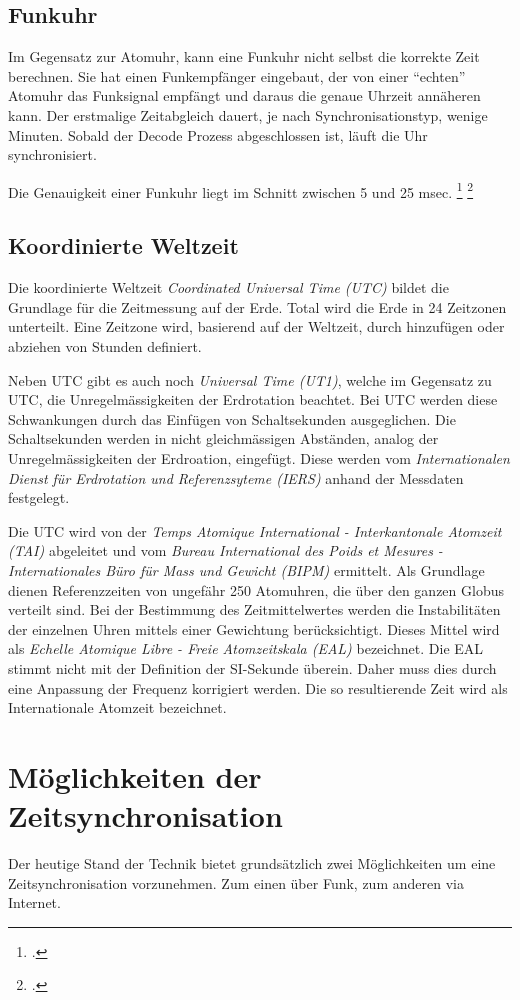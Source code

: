 \subsection{Funkuhr}
Im Gegensatz zur Atomuhr, kann eine Funkuhr nicht selbst die korrekte Zeit berechnen. Sie hat einen Funkempfänger eingebaut, der von einer "`echten"' Atomuhr das Funksignal empfängt und daraus die genaue Uhrzeit annäheren kann. Der erstmalige Zeitabgleich dauert, je nach Synchronisationstyp, wenige Minuten. Sobald der Decode Prozess abgeschlossen ist, läuft die Uhr synchronisiert.

Die Genauigkeit einer Funkuhr liegt im Schnitt zwischen 5 und 25 msec. \footcite{wikiFunkuhr} \footcite{heretFunkuhr}

\subsection{Koordinierte Weltzeit}
Die koordinierte Weltzeit \textit{Coordinated Universal Time (UTC)} bildet die Grundlage für die Zeitmessung auf der Erde. Total wird die Erde in 24 Zeitzonen unterteilt. Eine Zeitzone wird, basierend auf der Weltzeit, durch hinzufügen oder abziehen von Stunden definiert.

Neben UTC gibt es auch noch \textit{Universal Time (UT1)}, welche im Gegensatz zu UTC, die Unregelmässigkeiten der Erdrotation beachtet. Bei UTC werden diese Schwankungen durch das Einfügen von Schaltsekunden ausgeglichen. Die Schaltsekunden werden in nicht gleichmässigen Abständen, analog der Unregelmässigkeiten der Erdroation, eingefügt. Diese werden vom \textit{Internationalen Dienst für Erdrotation und Referenzsyteme (IERS)}  anhand der Messdaten festgelegt.

Die UTC wird von der \textit{Temps Atomique International - Interkantonale Atomzeit (TAI)} abgeleitet und vom \textit{Bureau International des Poids et Mesures - Internationales Büro für Mass und Gewicht (BIPM)} ermittelt.
Als Grundlage dienen Referenzzeiten von ungefähr 250 Atomuhren, die über den ganzen Globus verteilt sind.
Bei der Bestimmung des Zeitmittelwertes werden die Instabilitäten der einzelnen Uhren mittels einer Gewichtung berücksichtigt. Dieses Mittel wird als \textit{Echelle Atomique Libre - Freie Atomzeitskala (EAL)} bezeichnet. Die EAL stimmt nicht mit der Definition der SI-Sekunde überein. Daher muss dies durch eine Anpassung der Frequenz korrigiert werden. Die so resultierende Zeit wird als Internationale Atomzeit bezeichnet.

\section{Möglichkeiten der Zeitsynchronisation}
Der heutige Stand der Technik bietet grundsätzlich zwei Möglichkeiten um eine Zeitsynchronisation vorzunehmen. Zum einen über Funk, zum anderen via Internet.

